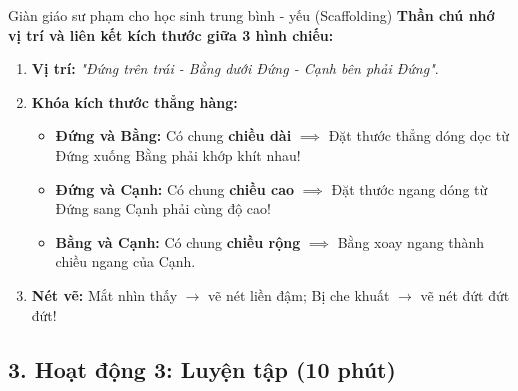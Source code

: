 \documentclass[12pt, a4paper]{article}
\begin{document}
\begin{scaffoldbox}{Giàn giáo sư phạm cho học sinh trung bình - yếu (Scaffolding)}
    \textbf{Thần chú nhớ vị trí và liên kết kích thước giữa 3 hình chiếu:}
    \begin{enumerate}[leftmargin=0.6cm]
        \item \textbf{Vị trí:} \textit{"Đứng trên trái - Bằng dưới Đứng - Cạnh bên phải Đứng"}.
        \item \textbf{Khóa kích thước thẳng hàng:}
        \begin{itemize}
            \item \textbf{Đứng và Bằng:} Có chung \textbf{chiều dài} $\implies$ Đặt thước thẳng dóng dọc từ Đứng xuống Bằng phải khớp khít nhau!
            \item \textbf{Đứng và Cạnh:} Có chung \textbf{chiều cao} $\implies$ Đặt thước ngang dóng từ Đứng sang Cạnh phải cùng độ cao!
            \item \textbf{Bằng và Cạnh:} Có chung \textbf{chiều rộng} $\implies$ Bằng xoay ngang thành chiều ngang của Cạnh.
        \end{itemize}
        \item \textbf{Nét vẽ:} Mắt nhìn thấy $\to$ vẽ nét liền đậm; Bị che khuất $\to$ vẽ nét đứt đứt đứt!
    \end{enumerate}
\end{scaffoldbox}

\subsection*{3. Hoạt động 3: Luyện tập (10 phút)}
\end{document}
